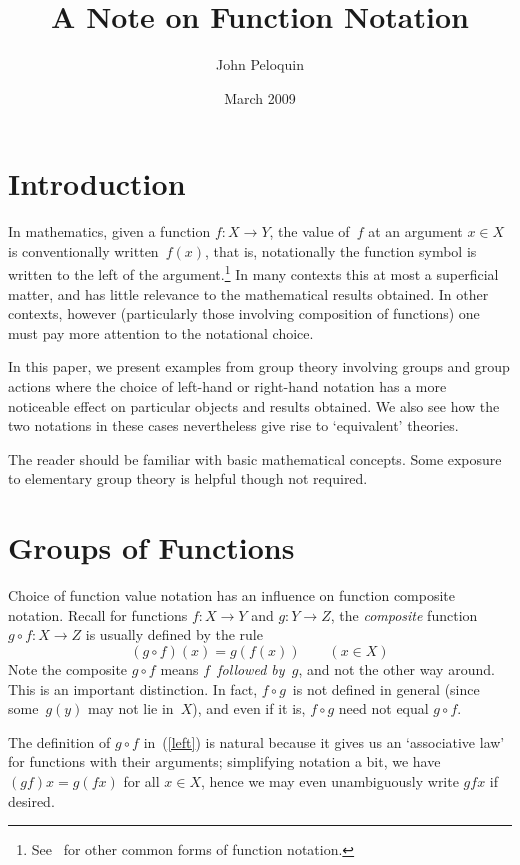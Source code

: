 \documentclass[letterpaper]{article}
\title{A Note on Function Notation}
\author{John Peloquin}
\date{March 2009}
\theoremstyle{definition}
\theoremstyle{plain}
\begin{document}
\maketitle
\section*{Introduction}
In mathematics, given a function $f:X\to Y$, the value of~$f$ at an argument $x\in X$ is conventionally written~$f(x)$, that is, notationally the function symbol is written to the left of the argument.\footnote{See~\cite{bergman97} for other common forms of function notation.} In many contexts this at most a superficial matter, and has little relevance to the mathematical results obtained. In other contexts, however (particularly those involving composition of functions) one must pay more attention to the notational choice.

In this paper, we present examples from group theory involving groups and group actions where the choice of left-hand or right-hand notation has a more noticeable effect on particular objects and results obtained. We also see how the two notations in these cases nevertheless give rise to `equivalent' theories.

The reader should be familiar with basic mathematical concepts. Some exposure to elementary group theory is helpful though not required.

\section*{Groups of Functions}
Choice of function value notation has an influence on function composite notation. Recall for functions $f:X\to Y$ and $g:Y\to Z$, the \emph{composite} function $g\circ f:X\to Z$ is usually defined by the rule
\begin{equation}
(g\circ f)(x)=g(f(x))\qquad(x\in X)\label{left}
\end{equation}
Note the composite $g\circ f$ means \emph{$f$~followed by~$g$}, and not the other way around. This is an important distinction. In fact, $f\circ g$~is not defined in general (since some~$g(y)$ may not lie in~$X$), and even if it is, $f\circ g$ need not equal $g\circ f$.

The definition of $g\circ f$ in~(\ref{left}) is natural because it gives us an `associative law' for functions with their arguments; simplifying notation a bit, we have $(gf)x=g(fx)$ for all $x\in X$, hence we may even unambiguously write $gfx$ if desired.
\end{document}
